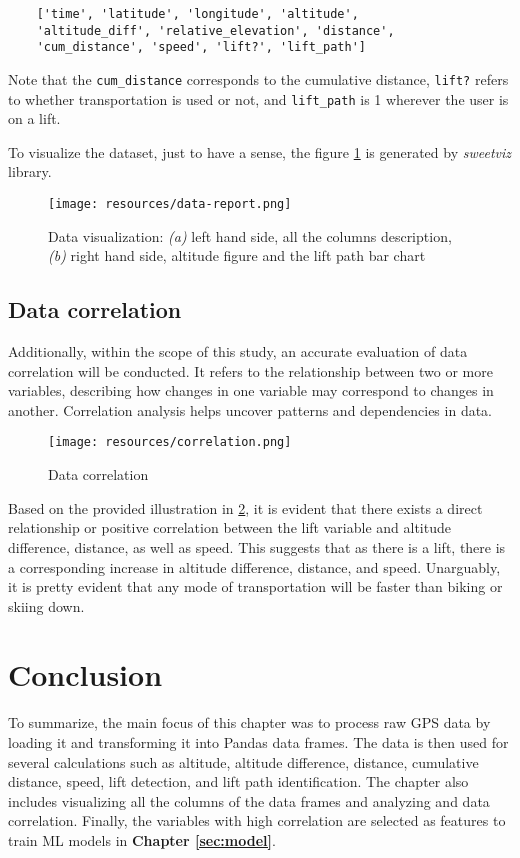 \begin{verbatim}
    ['time', 'latitude', 'longitude', 'altitude',
    'altitude_diff', 'relative_elevation', 'distance',
    'cum_distance', 'speed', 'lift?', 'lift_path']
\end{verbatim}

Note that the \texttt{cum\_distance} corresponds to the cumulative distance, 
\texttt{lift?} refers to whether transportation is used or not, and 
\texttt{lift\_path} is 1 wherever the user is on a lift.

To visualize the dataset, just to have a sense, the figure \ref{fig:data-report} is generated by \textit{sweetviz} library. 


\begin{figure}[htb]
	\texttt{[image: resources/data-report.png]}
	\caption{Data visualization: \textit{(a)} left hand side, all the columns description, \textit{(b)} right hand side, altitude figure and the lift path bar chart}
	\label{fig:data-report}
\end{figure}

\subsection{Data correlation}
Additionally, within the scope of this study, an accurate evaluation of data correlation will be conducted. It refers to the relationship between two or more variables, describing how changes in one variable may correspond to changes in another. Correlation analysis helps uncover patterns and dependencies in data.



\begin{figure}[htb]
	\texttt{[image: resources/correlation.png]}
	\caption{Data correlation}
	\label{fig:correlation}
\end{figure}

Based on the provided illustration in  \ref{fig:correlation}, it is evident that there exists a direct relationship or positive correlation between the lift variable and altitude difference, distance, as well as speed. This suggests that as there is a lift, there is a corresponding increase in altitude difference, distance, and speed. Unarguably, it is pretty evident that any mode of transportation will be faster than biking or skiing down.

\section{Conclusion}
\label{sec:data:conclusion}

To summarize, the main focus of this chapter was to process raw GPS data by loading it and transforming it into Pandas data frames. The data is then used for several calculations such as altitude, altitude difference, distance, cumulative distance, speed, lift detection, and lift path identification. The chapter also includes visualizing all the columns of the data frames and analyzing and data correlation. Finally, the variables with high correlation are selected as features to train ML models in
\textbf{Chapter \ref{sec:model}}.

